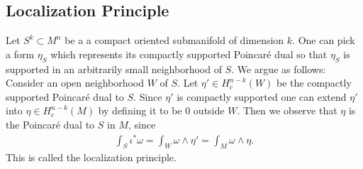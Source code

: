 \documentclass[12pt]{amsart}
\theoremstyle{remark}
\begin{document}
 \subsection{Localization Principle}
 Let $S^k \subset M^n$  be a a compact oriented submanifold of dimension $k$. One can pick a form  $ \eta_S$ which represents its compactly supported Poincaré dual so that $\eta_S$ is supported in an arbitrarily small neighborhood of $S$. We argue as follows: Consider an open neighborhood $W$ of $S$. Let $ \eta' \in H^{n-k}_c (W)$ be the compactly supported Poincaré dual to $S$. Since $ \eta'$ is compactly supported one can extend $ \eta'$ into $ \eta \in H^{n-k}_c ( M)$ by defining it to be $0$ outside $W$. Then we observe that $\eta$ is the Poincaré dual to $S$ in $M$, since
 \begin{align*}
     \int_S \iota^\ast  \omega = \int_{W} \omega \wedge \eta' = \int_{M} \omega \wedge \eta.  
 \end{align*}
 This is called the localization principle. 
\end{document}
